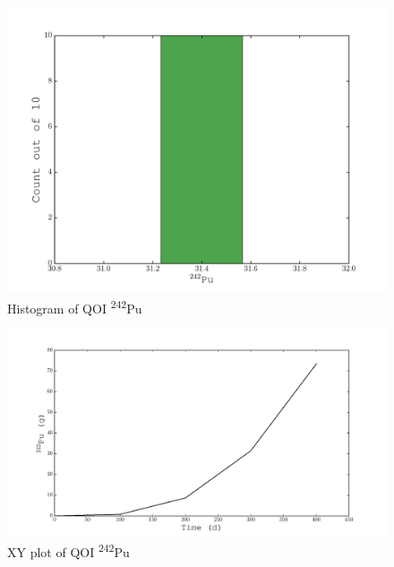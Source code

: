 \documentclass[11pt,notitlepage]{article}
\newcommand{\tss}{\textsuperscript}
\begin{document}
  \begin{figure}[H]
    \begin{center}
      \includegraphics[width=0.77\columnwidth]{../Origen2/PLOTS/PU242Post_HIST.pdf}
      \vspace{-5mm}
      \caption{Histogram of QOI \tss{242}Pu}
      \label{fig:POSTHISTPu242}
    \end{center}
  \end{figure}

    \begin{figure}[H]
    \begin{center}
      \includegraphics[width=0.77\columnwidth]{../Origen2/PLOTS/PU242Post_XY.pdf}
      \vspace{-5mm}
      \caption{XY plot of QOI \tss{242}Pu}
      \label{fig:POSTXYPu242}
    \end{center}
  \end{figure}
\end{document}
